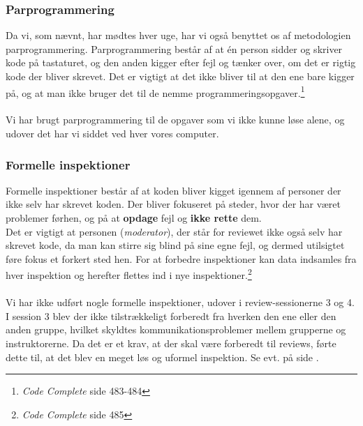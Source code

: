 \documentclass[12pt]{article}
\begin{document}
\subsubsection{Parprogrammering}
Da vi, som nævnt, har mødtes hver uge, har vi også benyttet os af metodologien parprogrammering. Parprogrammering består af at én person sidder og skriver kode på tastaturet, og den anden kigger efter fejl og tænker over, om det er rigtig kode der bliver skrevet. Det er vigtigt at det ikke bliver til at den ene bare kigger på, og at man ikke bruger det til de nemme programmeringsopgaver.\footnote{\emph{Code Complete} side 483-484}\\
\\
Vi har brugt parprogrammering til de opgaver som vi ikke kunne løse alene, og udover det har vi siddet ved hver vores computer.

\subsubsection{Formelle inspektioner}
Formelle inspektioner består af at koden bliver kigget igennem af personer der ikke selv har skrevet koden. Der bliver fokuseret på steder, hvor der har været problemer førhen, og på at \textbf{opdage} fejl og \textbf{ikke rette} dem.\\
Det er vigtigt at personen (\textit{moderator}), der står for reviewet ikke også selv har skrevet kode, da man kan stirre sig blind på sine egne fejl, og dermed utilsigtet føre fokus et forkert sted hen. For at forbedre inspektioner kan data indsamles fra hver inspektion og herefter flettes ind i nye inspektioner.\footnote{\emph{Code Complete} side 485}\\
\\
Vi har ikke udført nogle formelle inspektioner, udover i review-sessionerne 3 og 4.\\
I session 3 blev der ikke tilstrækkeligt forberedt fra hverken den ene eller den anden gruppe, hvilket skyldtes kommunikationsproblemer mellem grupperne og instruktorerne. Da det er et krav, at der skal være forberedt til reviews, førte dette til, at det blev en meget løs og uformel inspektion. Se evt.  på side \pageref{sec:bilag_review}.\\
\end{document}
